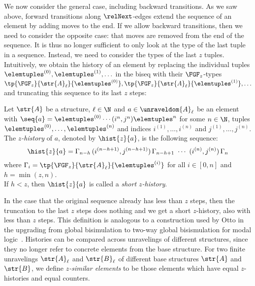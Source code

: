 We now consider the general case, including backward transitions.
As we saw above, forward transitions along $\relNext$-edges extend the sequence of an element by adding moves to the end.
If we allow backward transitions, then we need to consider the opposite case: that moves are removed from the end of the sequence.
It is thus no longer sufficient to only look at the type of the last tuple in a sequence.
Instead, we need to consider the types of the last $z$ tuples.
Intuitively, we obtain the history of an element by replacing the individual tuples $\elemtuples^{(0)}, \elemtuples^{(1)}, \ldots$ in the biseq with their $\FGF_{z}$-types $\tp{\FGF_{z}}{\str{A}_{\ell}}{\elemtuples^{(0)}}, \tp{\FGF_{z}}{\str{A}_{\ell}}{\elemtuples^{(1)}}, \ldots$ and truncating this sequence to its last $z$ steps:
\begin{definition}[$z$-history]
  Let $\str{A}$ be a structure, $\ell \in \N$ and $a \in \unraveldom{A}_{\ell}$ be an element with $\seq{a} = \elemtuples^{(0)} \cdots (i^{n}, j^{n})\elemtuples^{n}$ for some $n \in \N$, tuples $\elemtuples^{(0)}, \ldots, \elemtuples^{(n)}$ and indices $i^{(1)}, \ldots, i^{(n)}$ and $j^{(1)}, \ldots, j^{(n)}$.\\
  The \emph{$z$-history} of $a$, denoted by $\hist{z}{a}$, is the following sequence:
  \begin{equation*}
    \hist{z}{a} =
      \Gamma_{n-h}
      \,
      (i^{(n-h+1)}, j^{(n-h+1)})
      \,
      \Gamma_{n-h+1}
      \
      \cdots
      \
      (i^{(n)}, j^{(n)})
      \,
      \Gamma_{n}
  \end{equation*}
  where $\Gamma_{i} = \tp{\FGF_{z}}{\str{A}_{\ell}}{\elemtuples^{(i)}}$ for all $i \in [0,n]$ and $h = \min(z, n)$. \\[0.5ex]
  If $h < z$, then $\hist{z}{a}$ is called a \emph{short $z$-history}.
\end{definition}
In the case that the original sequence already has less than $z$ steps, then the truncation to the last $z$ steps does nothing and we get a short $z$-history, also with less than $z$ steps.
This definition is analogous to a construction used by Otto in the upgrading from global bisimulation to two-way global bisismulation for modal logic~\cite[Def. 39]{Otto04}.
Histories can be compared across unravelings of different structures, since they no longer refer to concrete elements from the base structure.
For two finite unravelings $\str{A}_{\ell}$ and $\str{B}_{\ell}$ of different base structures $\str{A}$ and $\str{B}$, we define \emph{$z$-similar elements} to be those elements which have equal $z$-histories and equal counters.
